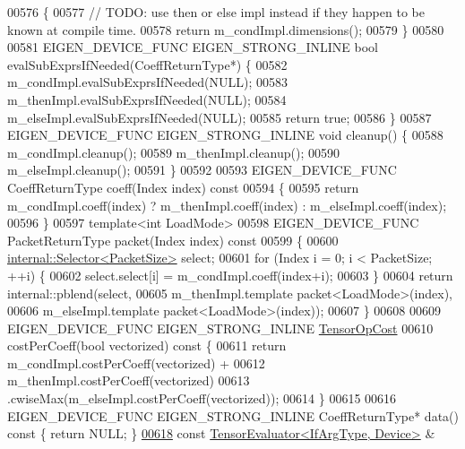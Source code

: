 \begin{DoxyCode}
00576 \textcolor{keyword}{  }\{
00577     \textcolor{comment}{// TODO: use then or else impl instead if they happen to be known at compile time.}
00578     \textcolor{keywordflow}{return} m\_condImpl.dimensions();
00579   \}
00580 
00581   EIGEN\_DEVICE\_FUNC EIGEN\_STRONG\_INLINE \textcolor{keywordtype}{bool} evalSubExprsIfNeeded(CoeffReturnType*) \{
00582     m\_condImpl.evalSubExprsIfNeeded(NULL);
00583     m\_thenImpl.evalSubExprsIfNeeded(NULL);
00584     m\_elseImpl.evalSubExprsIfNeeded(NULL);
00585     \textcolor{keywordflow}{return} \textcolor{keyword}{true};
00586   \}
00587   EIGEN\_DEVICE\_FUNC EIGEN\_STRONG\_INLINE \textcolor{keywordtype}{void} cleanup() \{
00588     m\_condImpl.cleanup();
00589     m\_thenImpl.cleanup();
00590     m\_elseImpl.cleanup();
00591   \}
00592 
00593   EIGEN\_DEVICE\_FUNC CoeffReturnType coeff(Index index)\textcolor{keyword}{ const}
00594 \textcolor{keyword}{  }\{
00595     \textcolor{keywordflow}{return} m\_condImpl.coeff(index) ? m\_thenImpl.coeff(index) : m\_elseImpl.coeff(index);
00596   \}
00597   \textcolor{keyword}{template}<\textcolor{keywordtype}{int} LoadMode>
00598   EIGEN\_DEVICE\_FUNC PacketReturnType packet(Index index)\textcolor{keyword}{ const}
00599 \textcolor{keyword}{  }\{
00600     \hyperlink{struct_eigen_1_1internal_1_1_selector}{internal::Selector<PacketSize>} select;
00601     \textcolor{keywordflow}{for} (Index i = 0; i < PacketSize; ++i) \{
00602       select.select[i] = m\_condImpl.coeff(index+i);
00603     \}
00604     \textcolor{keywordflow}{return} internal::pblend(select,
00605                             m\_thenImpl.template packet<LoadMode>(index),
00606                             m\_elseImpl.template packet<LoadMode>(index));
00607   \}
00608 
00609   EIGEN\_DEVICE\_FUNC EIGEN\_STRONG\_INLINE \hyperlink{class_eigen_1_1_tensor_op_cost}{TensorOpCost}
00610   costPerCoeff(\textcolor{keywordtype}{bool} vectorized)\textcolor{keyword}{ const }\{
00611     \textcolor{keywordflow}{return} m\_condImpl.costPerCoeff(vectorized) +
00612            m\_thenImpl.costPerCoeff(vectorized)
00613         .cwiseMax(m\_elseImpl.costPerCoeff(vectorized));
00614   \}
00615 
00616   EIGEN\_DEVICE\_FUNC EIGEN\_STRONG\_INLINE CoeffReturnType* data()\textcolor{keyword}{ const }\{ \textcolor{keywordflow}{return} NULL; \}
\hyperlink{struct_eigen_1_1_tensor_evaluator_3_01const_01_tensor_select_op_3_01_if_arg_type_00_01_then_arg_346b931156fad56ae8aa875afe41cb55_a6f8fea23435b866049d90dadd25955f3}{00618}   \textcolor{keyword}{const} \hyperlink{struct_eigen_1_1_tensor_evaluator}{TensorEvaluator<IfArgType, Device>} & 

\end{DoxyCode}
